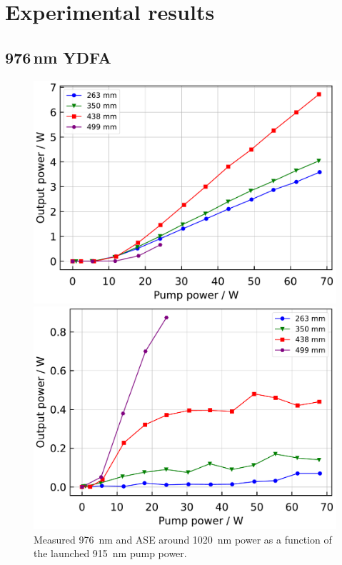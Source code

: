 \documentclass{osa-article}
\begin{document}
\section{Experimental results}
\subsection{976\,nm YDFA}

\begin{figure}[h!]
  \begin{minipage}[b]{0.5\linewidth}
    \centering
    \includegraphics[keepaspectratio, width=0.9\linewidth]{./Figure/Yb1200-20-125DC-PM_SignalComparisonByLength_915Pump976Seed_Exp}
    \subcaption{}
  \end{minipage}
  \begin{minipage}[b]{0.5\linewidth}
    \centering
    \includegraphics[keepaspectratio, width=0.9\linewidth]{./Figure/Yb1200-20-125DC-PM_ASEComparisonByLength_915Pump976Seed_Exp}
    \subcaption{}
  \end{minipage}
  \caption{Measured \SI{976}{\nm} and ASE around \SI{1020}{\nm} power as a function of the launched \SI{915}{\nm} pump power.}
  \label{fig:OutputComparisonOfNLIGHT976YDFA}
\end{figure}
\end{document}
